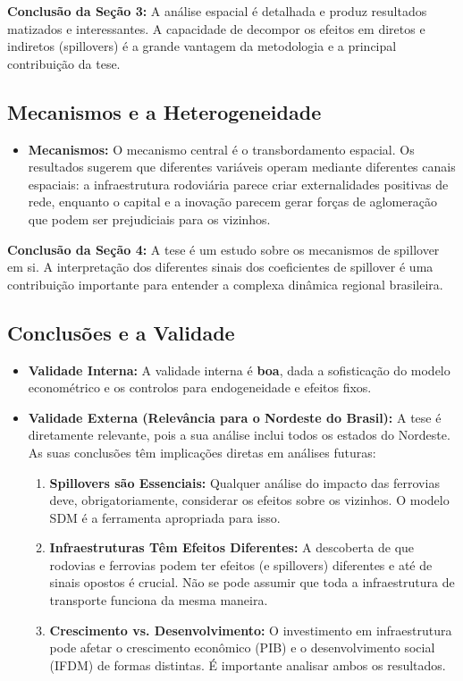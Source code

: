 \documentclass[12pt, a4paper]{article}
\begin{document}
\noindent\textbf{Conclusão da Seção 3:} A análise espacial é detalhada e produz resultados matizados e interessantes. A capacidade de decompor os efeitos em diretos e indiretos (spillovers) é a grande vantagem da metodologia e a principal contribuição da tese.

\subsection{Mecanismos e a Heterogeneidade}

\begin{itemize}
    \item \textbf{Mecanismos:} O mecanismo central é o transbordamento espacial. Os resultados sugerem que diferentes variáveis operam mediante diferentes canais espaciais: a infraestrutura rodoviária parece criar externalidades positivas de rede, enquanto o capital e a inovação parecem gerar forças de aglomeração que podem ser prejudiciais para os vizinhos.
\end{itemize}

\noindent\textbf{Conclusão da Seção 4:} A tese é um estudo sobre os mecanismos de spillover em si. A interpretação dos diferentes sinais dos coeficientes de spillover é uma contribuição importante para entender a complexa dinâmica regional brasileira.

\subsection{Conclusões e a Validade}
\begin{itemize}
    \item \textbf{Validade Interna:} A validade interna é \textbf{boa}, dada a sofisticação do modelo econométrico e os controlos para endogeneidade e efeitos fixos.
    \item \textbf{Validade Externa (Relevância para o Nordeste do Brasil):} A tese é diretamente relevante, pois a sua análise inclui todos os estados do Nordeste. As suas conclusões têm implicações diretas em análises futuras:
        \begin{enumerate}
            \item \textbf{Spillovers são Essenciais:} Qualquer análise do impacto das ferrovias deve, obrigatoriamente, considerar os efeitos sobre os vizinhos. O modelo SDM é a ferramenta apropriada para isso.
            \item \textbf{Infraestruturas Têm Efeitos Diferentes:} A descoberta de que rodovias e ferrovias podem ter efeitos (e spillovers) diferentes e até de sinais opostos é crucial. Não se pode assumir que toda a infraestrutura de transporte funciona da mesma maneira.
            \item \textbf{Crescimento vs. Desenvolvimento:} O investimento em infraestrutura pode afetar o crescimento econômico (PIB) e o desenvolvimento social (IFDM) de formas distintas. É importante analisar ambos os resultados.
        \end{enumerate}
\end{itemize}
\end{document}
